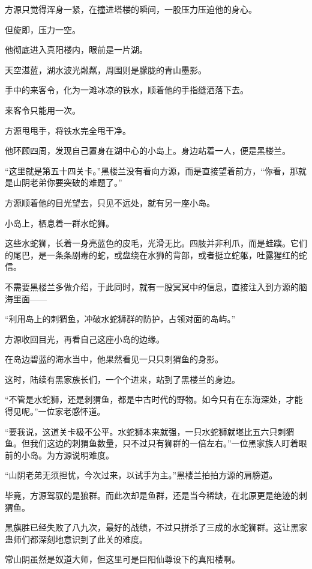 
\begin{this_body}

方源只觉得浑身一紧，在撞进塔楼的瞬间，一股压力压迫他的身心。

但旋即，压力一空。

他彻底进入真阳楼内，眼前是一片湖。

天空湛蓝，湖水波光粼粼，周围则是朦胧的青山墨影。

手中的来客令，化为一滩冰凉的铁水，顺着他的手指缝洒落下去。

来客令只能用一次。

方源甩甩手，将铁水完全甩干净。

他环顾四周，发现自己置身在湖中心的小岛上。身边站着一人，便是黑楼兰。

“这里就是第五十四关卡。”黑楼兰没有看向方源，而是直接望着前方，“你看，那就是山阴老弟你要突破的难题了。”

方源顺着他的目光望去，只见不远处，就有另一座小岛。

小岛上，栖息着一群水蛇狮。

这些水蛇狮，长着一身亮蓝色的皮毛，光滑无比。四肢并非利爪，而是蛙蹼。它们的尾巴，是一条条剧毒的蛇，或盘绕在水狮的背部，或者挺立蛇躯，吐露猩红的蛇信。

不需要黑楼兰多做介绍，于此同时，就有一股冥冥中的信息，直接注入到方源的脑海里面——

“利用岛上的刺猬鱼，冲破水蛇狮群的防护，占领对面的岛屿。”

方源收回目光，再看自己这座小岛的边缘。

在岛边碧蓝的海水当中，他果然看见一只只刺猬鱼的身影。

这时，陆续有黑家族长们，一个个进来，站到了黑楼兰的身边。

“不管是水蛇狮，还是刺猬鱼，都是中古时代的野物。如今只有在东海深处，才能得见呢。”一位家老感怀道。

“要我说，这道关卡极不公平。水蛇狮本来就强，一只水蛇狮就堪比五六只刺猬鱼。但我们这边的刺猬鱼数量，只不过只有狮群的一倍左右。”一位黑家族人盯着眼前的小岛。为方源说明难度。

“山阴老弟无须担忧，今次过来，以试手为主。”黑楼兰拍拍方源的肩膀道。

毕竟，方源驾驭的是狼群。而此次却是鱼群，还是当今稀缺，在北原更是绝迹的刺猬鱼。

黑旗胜已经失败了八九次，最好的战绩，不过只拼杀了三成的水蛇狮群。这让黑家蛊师们都深刻地意识到了此关的难度。

常山阴虽然是奴道大师，但这里可是巨阳仙尊设下的真阳楼啊。


\end{this_body}
